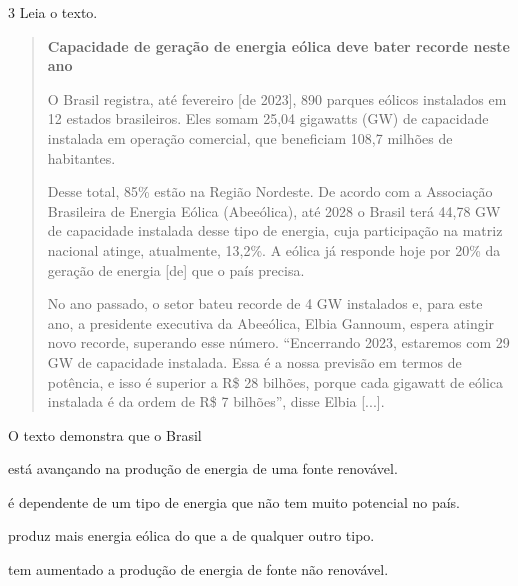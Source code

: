\num{3} Leia o texto.

\begin{quote}
\textbf{Capacidade de geração de energia eólica deve bater recorde neste ano}

O Brasil registra, até fevereiro [de 2023], 890 parques eólicos instalados em 12 estados brasileiros. Eles somam 25,04 gigawatts (GW) de capacidade instalada em operação comercial, que beneficiam 108,7 milhões de habitantes.

Desse total, 85\% estão na Região Nordeste. De acordo com a Associação Brasileira de Energia Eólica (Abeeólica), até 2028 o Brasil terá 44,78 GW de capacidade instalada desse tipo de energia, cuja participação na matriz nacional atinge, atualmente, 13,2\%. A eólica já responde hoje por 20\% da geração de energia [de] que o país precisa.

No ano passado, o setor bateu recorde de 4 GW instalados e, para este ano, a presidente executiva da Abeeólica, Elbia Gannoum, espera atingir novo recorde, superando esse número. “Encerrando 2023, estaremos com 29 GW de capacidade instalada. Essa é a nossa previsão em termos de potência, e isso é superior a R\$ 28 bilhões, porque cada gigawatt de eólica instalada é da ordem de R\$ 7 bilhões”, disse Elbia {[}...{]}.

\end{quote}

O texto demonstra que o Brasil

\begin{escolha}
\item
  está avançando na produção de energia de uma fonte renovável.
\item
  é dependente de um tipo de energia que não tem muito potencial no país.
\item
  produz mais energia eólica do que a de qualquer outro tipo.
\item
  tem aumentado a produção de energia de fonte não renovável.
\end{escolha}



